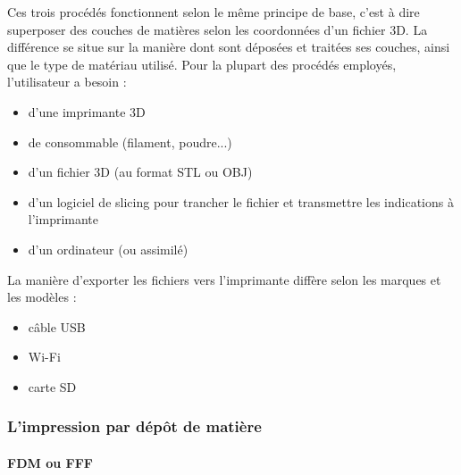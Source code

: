 \documentclass{article}
\begin{document}
Ces trois procédés fonctionnent selon le même principe de base, c'est à dire superposer des couches de matières selon les coordonnées d'un fichier 3D. La différence se situe sur la manière dont sont déposées et traitées ses couches, ainsi que le type de matériau utilisé.\hfill
\newline
Pour la plupart des procédés employés, l'utilisateur a besoin :
\begin{itemize}
\item d'une imprimante 3D
\item de consommable (filament, poudre...)
\item d'un fichier 3D (au format STL ou OBJ)
\item d'un logiciel de slicing pour trancher le fichier et transmettre les indications à l'imprimante
\item d'un ordinateur (ou assimilé)
\end{itemize}\hfill \break
La manière d'exporter les fichiers vers l'imprimante diffère selon les marques et les modèles :
\begin{itemize}
\item câble USB
\item Wi-Fi
\item carte SD
\end{itemize}

\subsubsection{L'impression par dépôt de matière}
\paragraph{FDM ou FFF} \hfill
\end{document}
